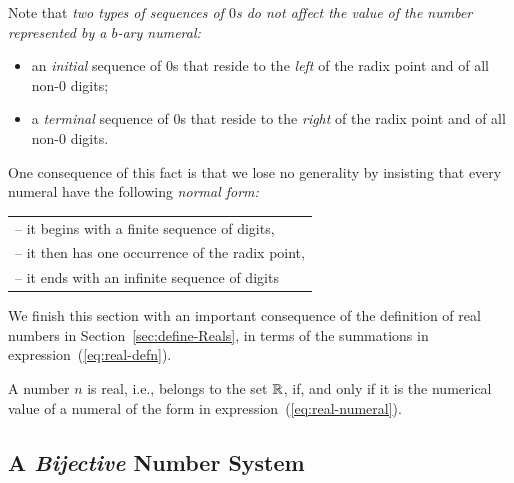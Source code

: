 Note that {\em two types of sequences of $0$s do not affect the value of the number represented by a $b$-ary numeral:}
\begin{itemize}
\item
an {\em initial} sequence of $0$s that reside to the {\em left} of the radix point and of all non-$0$ digits;
\medskip\item
a {\em terminal} sequence of $0$s that reside to the {\em right} of the radix point and of all non-$0$ digits.
\end{itemize}
One consequence of this fact is that we lose no generality by insisting that every numeral have the following {\em normal form:}

\smallskip

\hspace*{.15in}
\begin{tabular}{l}
-- it begins with a finite sequence of digits, \\
-- it then has one occurrence of the radix point, \\
-- it ends with an infinite sequence of digits
\end{tabular}

\bigskip

We finish this section with an important consequence of the definition of real numbers in Section~\ref{sec:define-Reals}, in terms of the summations in expression~(\ref{eq:real-defn}).

\begin{prop}
\label{thm:define-Reals-via-numerals}
A number $n$ is real, i.e., belongs to the set $\mathbb{R}$, if, and only if it is the numerical value of a numeral of the form in expression~(\ref{eq:real-numeral}).
\end{prop}

\subsection{A {\em Bijective} Number System}
\label{sec:bijective-adic}

